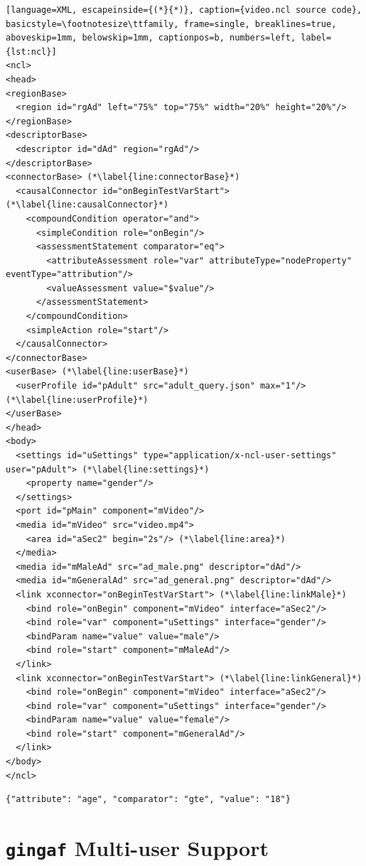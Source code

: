 \documentclass[sigconf,authorversion,review,authordraft]{webmedia}
\begin{document}
\begin{lstlisting}[language=XML, escapeinside={(*}{*)}, caption={video.ncl source code}, basicstyle=\footnotesize\ttfamily, frame=single, breaklines=true, aboveskip=1mm, belowskip=1mm, captionpos=b, numbers=left, label={lst:ncl}]
<ncl>
<head>
<regionBase>
  <region id="rgAd" left="75%" top="75%" width="20%" height="20%"/>
</regionBase>
<descriptorBase>
  <descriptor id="dAd" region="rgAd"/>
</descriptorBase>
<connectorBase> (*\label{line:connectorBase}*)
  <causalConnector id="onBeginTestVarStart"> (*\label{line:causalConnector}*)
    <compoundCondition operator="and">
      <simpleCondition role="onBegin"/>
      <assessmentStatement comparator="eq">
        <attributeAssessment role="var" attributeType="nodeProperty" eventType="attribution"/>
        <valueAssessment value="$value"/>
      </assessmentStatement>
    </compoundCondition>
    <simpleAction role="start"/>
  </causalConnector>
</connectorBase>
<userBase> (*\label{line:userBase}*)
  <userProfile id="pAdult" src="adult_query.json" max="1"/> (*\label{line:userProfile}*)
</userBase>
</head>
<body>
  <settings id="uSettings" type="application/x-ncl-user-settings" user="pAdult"> (*\label{line:settings}*)
    <property name="gender"/>
  </settings>
  <port id="pMain" component="mVideo"/>
  <media id="mVideo" src="video.mp4">
    <area id="aSec2" begin="2s"/> (*\label{line:area}*)
  </media>
  <media id="mMaleAd" src="ad_male.png" descriptor="dAd"/>
  <media id="mGeneralAd" src="ad_general.png" descriptor="dAd"/>
  <link xconnector="onBeginTestVarStart"> (*\label{line:linkMale}*)
    <bind role="onBegin" component="mVideo" interface="aSec2"/>
    <bind role="var" component="uSettings" interface="gender"/>
    <bindParam name="value" value="male"/>
    <bind role="start" component="mMaleAd"/>
  </link>
  <link xconnector="onBeginTestVarStart"> (*\label{line:linkGeneral}*)
    <bind role="onBegin" component="mVideo" interface="aSec2"/>
    <bind role="var" component="uSettings" interface="gender"/>
    <bindParam name="value" value="female"/>
    <bind role="start" component="mGeneralAd"/>
  </link>
</body>
</ncl>
\end{lstlisting}

\begin{lstlisting}[caption={\texttt{adult\_query.json}}, basicstyle=\footnotesize\ttfamily, label={lst:adult_query_json}]
{"attribute": "age", "comparator": "gte", "value": "18"}
\end{lstlisting}

\section{\texttt{gingaf} Multi-user Support}
\label{sec:multiuser}
\end{document}
